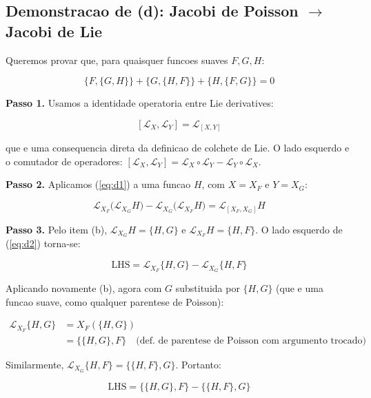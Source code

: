 \documentclass[12pt,a4paper,oneside]{article}
\begin{document}
\subsection*{Demonstracao de (d): Jacobi de Poisson $\to$ Jacobi de Lie}

Queremos provar que, para quaisquer funcoes suaves $F, G, H$:

$$\{F,\{G,H\}\} + \{G,\{H,F\}\} + \{H,\{F,G\}\} = 0$$

\textbf{Passo 1.} Usamos a identidade operatoria entre Lie derivatives:

\begin{equation}\label{eq:d1}
[\mathcal{L}_X, \mathcal{L}_Y] = \mathcal{L}_{[X,Y]}
\end{equation}

que e uma consequencia direta da definicao de colchete de Lie. O lado
esquerdo e o comutador de operadores: $[\mathcal{L}_X,\mathcal{L}_Y] =
\mathcal{L}_X \circ \mathcal{L}_Y - \mathcal{L}_Y \circ \mathcal{L}_X$.

\textbf{Passo 2.} Aplicamos (\ref{eq:d1}) a uma funcao $H$, com $X = X_F$
e $Y = X_G$:

\begin{equation}\label{eq:d2}
\mathcal{L}_{X_F}\big(\mathcal{L}_{X_G}H\big) -
\mathcal{L}_{X_G}\big(\mathcal{L}_{X_F}H\big) =
\mathcal{L}_{[X_F,X_G]}H
\end{equation}

\textbf{Passo 3.} Pelo item (b), $\mathcal{L}_{X_G}H = \{H,G\}$ e
$\mathcal{L}_{X_F}H = \{H,F\}$. O lado esquerdo de (\ref{eq:d2}) torna-se:

\begin{equation}\label{eq:d3}
\text{LHS} = \mathcal{L}_{X_F}\{H,G\} - \mathcal{L}_{X_G}\{H,F\}
\end{equation}

Aplicando novamente (b), agora com $G$ substituida por $\{H,G\}$ (que e
uma funcao suave, como qualquer parentese de Poisson):

\begin{align*}
\mathcal{L}_{X_F}\{H,G\} &= X_F(\{H,G\}) \\
&= \{\{H,G\}, F\} \quad\text{(def. de parentese de Poisson com argumento trocado)}
\end{align*}

Similarmente, $\mathcal{L}_{X_G}\{H,F\} = \{\{H,F\}, G\}$.
Portanto:

\begin{equation}\label{eq:d4}
\text{LHS} = \{\{H,G\}, F\} - \{\{H,F\}, G\}
\end{equation}
\end{document}
